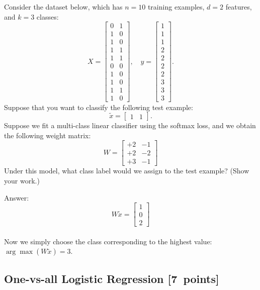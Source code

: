 \documentclass{article}
\newcommand{\blu}[1]{{\textcolor{blu}{#1}}}
\newenvironment{answer}{\par\begingroup\color{gre}Answer: }{\endgroup}
\let\ask\blu
\newcommand\pts[1]{\textcolor{pointscolour}{[#1~points]}}
\begin{document}
Consider the dataset below, which has $n=10$ training examples, $d=2$ features, and $k=3$ classes:
\[
X = \begin{bmatrix}0 & 1\\1 & 0\\ 1 & 0\\ 1 & 1\\ 1 & 1\\ 0 & 0\\  1 & 0\\  1 & 0\\  1 & 1\\  1 &0\end{bmatrix}, \quad y = \begin{bmatrix}1\\1\\1\\2\\2\\2\\2\\3\\3\\3\end{bmatrix}.
\]
Suppose that you want to classify the following test example:
\[
\tilde{x} = \begin{bmatrix}1 & 1\end{bmatrix}.
\]
Suppose we fit a multi-class linear classifier using the softmax loss, and we obtain the following weight matrix:
\[
W =
\begin{bmatrix}
+2 & -1\\
+2 & -2\\
+3 & -1
\end{bmatrix}
\]
\ask{Under this model, what class label would we assign to the test example? (Show your work.)}
\begin{answer}
    \[
    W \tilde{x} =
    \begin{bmatrix}
    1\\
    0\\
    2
    \end{bmatrix}
    \]\\
    Now we simply choose the class corresponding to the highest value: $\arg \max \left(W \tilde{x}\right) = 3$.
\end{answer}



\subsection{One-vs-all Logistic Regression \pts{7}}
\end{document}
